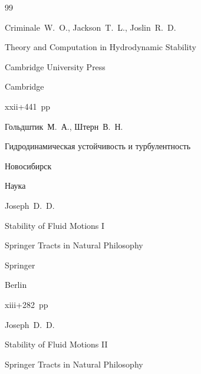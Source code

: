 \begin{thebibliography}{99}

\by Criminale~W.~O., Jackson~T.~L., Joslin~R.~D.

\book Theory and Computation in Hydrodynamic Stability

\publ Cambridge University Press

\publaddr Cambridge 


\totalpages xxii+441~pp \nofrills







\by Гольдштик~М.~А., Штерн~В.~Н.

\book Гидродинамическая устойчивость и турбулентность

\publaddr Новосибирск

\publ Наука













\by Joseph~D.~D.

\book Stability of Fluid Motions I


\serial Springer Tracts in Natural Philosophy


\publ Springer

\publaddr Berlin

\totalpages xiii+282~pp \nofrills


\moreref

\by Joseph~D.~D.

\book Stability of Fluid Motions II


\serial Springer Tracts in Natural Philosophy


\end{thebibliography}
